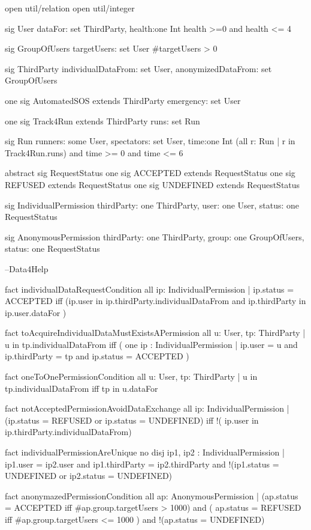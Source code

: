 \documentclass[a4paper]{article}
\begin{document}
{\selectfont
open util/relation 
open util/integer

sig User {
dataFor: set ThirdParty,
health:one Int
} { health >=0 and health <= 4}

sig GroupOfUsers {
targetUsers: set User
}{#targetUsers > 0}

sig ThirdParty {
individualDataFrom: set User,
anonymizedDataFrom: set GroupOfUsers
}

one sig AutomatedSOS extends ThirdParty {
	emergency: set User
}

one sig Track4Run extends ThirdParty {
runs: set Run 
}

sig Run{
runners: some User,
spectators: set User,
time:one Int
}{(all r: Run | r in Track4Run.runs) and time >= 0 and time <= 6 }


abstract sig RequestStatus {}
one sig ACCEPTED extends RequestStatus {}
one sig REFUSED extends RequestStatus {}
one sig UNDEFINED extends RequestStatus{}

sig IndividualPermission {
thirdParty: one ThirdParty,
user: one User,
status: one RequestStatus
}

sig AnonymousPermission {
thirdParty: one ThirdParty,
group: one GroupOfUsers,
status: one  RequestStatus
}

--Data4Help

fact individualDataRequestCondition {
all ip: IndividualPermission | ip.status = ACCEPTED iff (ip.user in ip.thirdParty.individualDataFrom and ip.thirdParty in ip.user.dataFor )
}

fact toAcquireIndividualDataMustExistsAPermission{
all u: User, tp: ThirdParty | u in tp.individualDataFrom iff ( one ip : IndividualPermission | ip.user = u and ip.thirdParty = tp and ip.status = ACCEPTED )
}

fact oneToOnePermissionCondition{
	all u: User, tp: ThirdParty | u in tp.individualDataFrom iff tp in u.dataFor
}

fact notAcceptedPermissionAvoidDataExchange{
all ip: IndividualPermission | (ip.status = REFUSED or ip.status = UNDEFINED) iff !( ip.user in ip.thirdParty.individualDataFrom)
}

fact individualPermissionAreUnique{
no disj ip1, ip2 : IndividualPermission |  ip1.user = ip2.user and  ip1.thirdParty = ip2.thirdParty and !(ip1.status = UNDEFINED or ip2.status = UNDEFINED)
}

fact anonymazedPermissionCondition {
all ap: AnonymousPermission | (ap.status = ACCEPTED iff #ap.group.targetUsers > 1000) and ( ap.status = REFUSED iff #ap.group.targetUsers <= 1000  ) and !(ap.status = UNDEFINED)
}

}
\end{document}
